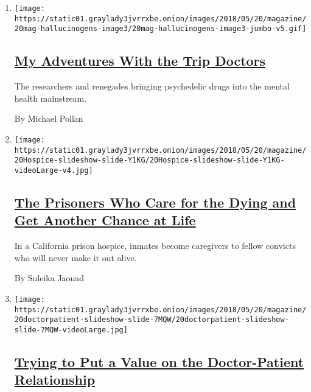 \begin{enumerate}
\def\labelenumi{\arabic{enumi}.}
\item
  \texttt{[image: https://static01.graylady3jvrrxbe.onion/images/2018/05/20/magazine/20mag-hallucinogens-image3/20mag-hallucinogens-image3-jumbo-v5.gif]}

  \hypertarget{my-adventures-with-the-trip-doctors}{%
  \subsection{\texorpdfstring{\href{/interactive/2018/05/15/magazine/health-issue-my-adventures-with-hallucinogenic-drugs-medicine.html}{My
  Adventures With the Trip
  Doctors}}{My Adventures With the Trip Doctors}}\label{my-adventures-with-the-trip-doctors}}

  The researchers and renegades bringing psychedelic drugs into the
  mental health mainstream.

  By Michael Pollan
\item
  \texttt{[image: https://static01.graylady3jvrrxbe.onion/images/2018/05/20/magazine/20Hospice-slideshow-slide-Y1KG/20Hospice-slideshow-slide-Y1KG-videoLarge-v4.jpg]}

  \hypertarget{the-prisoners-who-care-for-the-dying-and-get-another-chance-at-life}{%
  \subsection{\texorpdfstring{\href{/interactive/2018/05/16/magazine/health-issue-convicted-prisoners-becoming-caregivers.html}{The
  Prisoners Who Care for the Dying and Get Another Chance at
  Life}}{The Prisoners Who Care for the Dying and Get Another Chance at Life}}\label{the-prisoners-who-care-for-the-dying-and-get-another-chance-at-life}}

  In a California prison hospice, inmates become caregivers to fellow
  convicts who will never make it out alive.

  By Suleika Jaouad
\item
  \texttt{[image: https://static01.graylady3jvrrxbe.onion/images/2018/05/20/magazine/20doctorpatient-slideshow-slide-7MQW/20doctorpatient-slideshow-slide-7MQW-videoLarge.jpg]}

  \hypertarget{trying-to-put-a-value-on-the-doctor-patient-relationship}{%
  \subsection{\texorpdfstring{\href{/interactive/2018/05/16/magazine/health-issue-reinvention-of-primary-care-delivery.html}{Trying
  to Put a Value on the Doctor-Patient
  Relationship}}{Trying to Put a Value on the Doctor-Patient Relationship}}\label{trying-to-put-a-value-on-the-doctor-patient-relationship}}


\end{enumerate}
